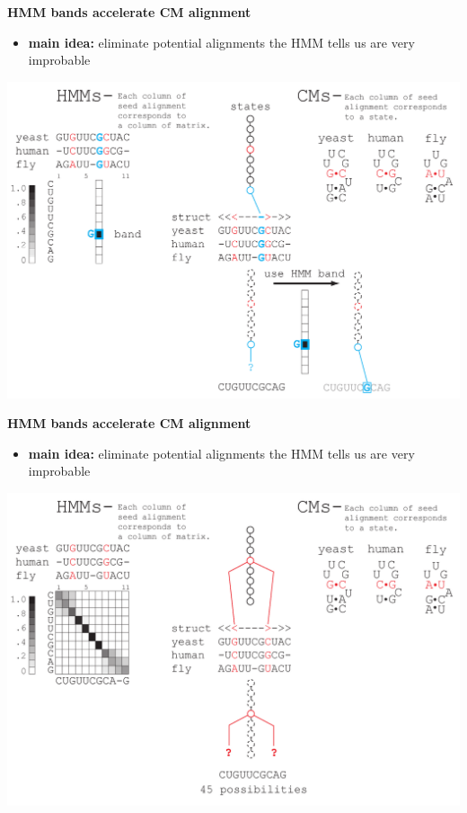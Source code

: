 \documentclass[landscape]{slides}
\begin{document}
\begin{slide}
\begin{center}

\textbf{HMM bands accelerate CM alignment}
\end{center}
\medskip
\small
\begin{itemize}
\item
\textbf{main idea:} eliminate potential alignments the HMM tells us are very improbable
\end{itemize}
\begin{center}
\includegraphics[width=8in]{figs/post_hmm_to_cm_map2_layer13}
\end{center}
\vfill
\end{slide}
\begin{slide}
\begin{center}

\textbf{HMM bands accelerate CM alignment}
\end{center}
\medskip
\small
\begin{itemize}
\item
\textbf{main idea:} eliminate potential alignments the HMM tells us are very improbable
\end{itemize}
\begin{center}
\includegraphics[width=8in]{figs/post_hmm_to_cm_map2_layer14}
\end{center}
\vfill
\end{slide}
\end{document}
